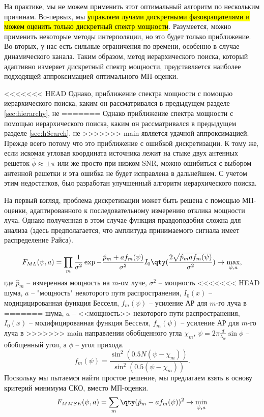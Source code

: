 На практике, мы не можем применить этот оптимальный алгоритм по нескольким
причинам. Во-первых, мы \hl{управляем лучами дискретными фазовращателями и можем
    оценить только дискретный спектр мощности}. Разумеется, можно применить некоторые
методы интерполяции, но это будет только приближение.  Во-вторых, у нас есть
сильные ограничения по времени, особенно в случае динамического канала.  Таким
образом, метод иерархического поиска, который адаптивно измеряет дискретный
спектр мощности, представляется наиболее подходящей аппроксимацией оптимального
МП-оценки.

<<<<<<< HEAD
Однако, приближение спектра мощности с помощью иерархического
поиска, каким он рассматривался в предыдущем разделе \eqref{sec:hierarchy}, не
=======
Однако приближение спектра мощности с помощью иерархического
поиска, каким он рассматривался в предыдущем разделе \eqref{sec:hSearch}, не
>>>>>>> main
является удачной аппроксимацией.  Прежде всего потому что это приближение с
ошибкой дискретизации. К тому же, если искомая угловая координата источника
лежит на стыке  двух антенных решеток $\hat \phi \approx \pm \pi$ или же просто
при низком SNR,  можно ошибиться с выбором антенной решетки и эта ошибка не
будет исправлена в дальнейшем. С учетом этим недостатков, был разработан
улучшенный алгоритм иерархического поиска.


На первый взгляд, проблема дискретизации может быть решена с помощью
МП-оценки, адаптированного к последовательному измерению отклика мощности
луча. Однако полученная в этом случае функция правдоподобия сложна для анализа
(здесь предполагается, что амплитуда принимаемого сигнала имеет распределение
Райса).

\begin{equation}
    F_{ML}(\psi, a) = \prod\limits_m \frac{1}{\sigma^2}
    \exp{-\frac{\hat p_m + a f_m(\psi)}{\sigma^2}
        I_0\qty(\frac{2\sqrt{\hat p_m a f_m(\psi)}}{\sigma^2})} \to \max_{\psi, a},
\end{equation}
где $\hat p_m$ -- измеренная мощность на $m$-ом луче, $\sigma^2$ -- мощность
<<<<<<< HEAD
шума, $a$ -- "мощность" некоторого путя распространения, $I_0(x)$ --
модицицированная функция Бесселя, $f_m(\psi)$ -- усиление АР для $m$-го луча в
=======
шума, $a$ -- <<мощность>> некоторого пути распространения, $I_0(x)$ --
модифицированная функция Бесселя, $f_m(\psi)$ -- усиление АР для $m$-го луча в
>>>>>>> main
направлении обобщенного угла $\chi_m$, $\psi = 2\pi \frac{d}{\lambda_w}\sin
    \phi$ -- обобщенный угол, а $\phi$ -- угол прихода.
\begin{equation}
    f_m(\psi) = \frac{\sin^2 (0.5N(\psi - \chi_m))}{\sin^2(0.5(\psi - \chi_m))}.
\end{equation}
Поскольку мы пытаемся найти простое решение, мы предлагаем взять в основу
критерий минимума СКО, вместо МП-оценки.
\begin{equation}
    \label{eq:26}
    F_{MMSE}(\psi, a) = \sum\limits_m \qty(\hat p_m - a f_m(\psi))^2 \to \min_{\psi,a}
\end{equation}

